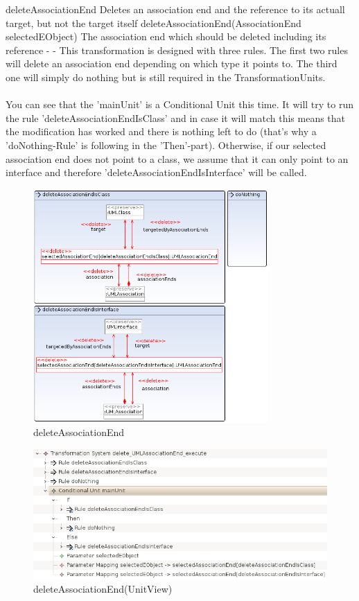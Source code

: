 \op
{deleteAssociationEnd}
{Deletes an association end and the reference to its actuall target, but not
the target itself}
{deleteAssociationEnd(AssociationEnd selectedEObject)}
{The association end which should be deleted including its reference}
{-}
{-}
{This transformation is designed with three rules. The first two rules will
delete an association end depending on which type it points to. The third one
will simply do nothing but is still required in the TransformationUnits.
\\\\You can see that the 'mainUnit' is a Conditional Unit this time. It will try to
run the rule 'deleteAssociationEndIsClass' and in case it will match this
means that the modification has worked and there is nothing left to do (that's
why a 'doNothing-Rule' is following in the 'Then'-part). Otherwise, if our
selected association end does not point to a class, we assume that it can only point to
an interface and therefore 'deleteAssociationEndIsInterface' will be called.
}
\begin{figure}[H]
  \centering
  \includegraphics[width=0.8\textwidth]{pics/deleteAssociationEnd.png}
  \caption{deleteAssociationEnd}
  \label{deleteAssociationEnd}
\end{figure}
\begin{figure}[H]
  \centering
  \includegraphics[width=1.0\textwidth]{pics/deleteAssociationEnd_TreeView.png}
  \caption{deleteAssociationEnd(UnitView)}
  \label{deleteAssociationEnd(UnitView)}
\end{figure}
